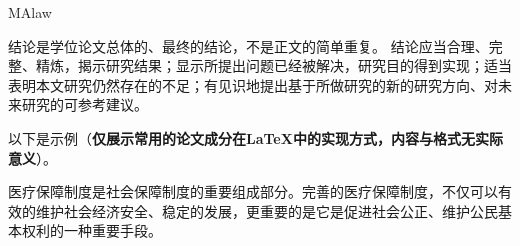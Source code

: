 
\begin{conclusion}{MAlaw}

结论是学位论文总体的、最终的结论，不是正文的简单重复。
结论应当合理、完整、精炼，揭示研究结果；显示所提出问题已经被解决，研究目的得到实现；适当表明本文研究仍然存在的不足；有见识地提出基于所做研究的新的研究方向、对未来研究的可参考建议。

以下是示例（{\bf 仅展示常用的论文成分在LaTeX中的实现方式，内容与格式无实际意义}）。

医疗保障制度是社会保障制度的重要组成部分。完善的医疗保障制度，不仅可以有效的维护社会经济安全、稳定的发展，更重要的是它是促进社会公正、维护公民基本权利的一种重要手段。

\end{conclusion}


